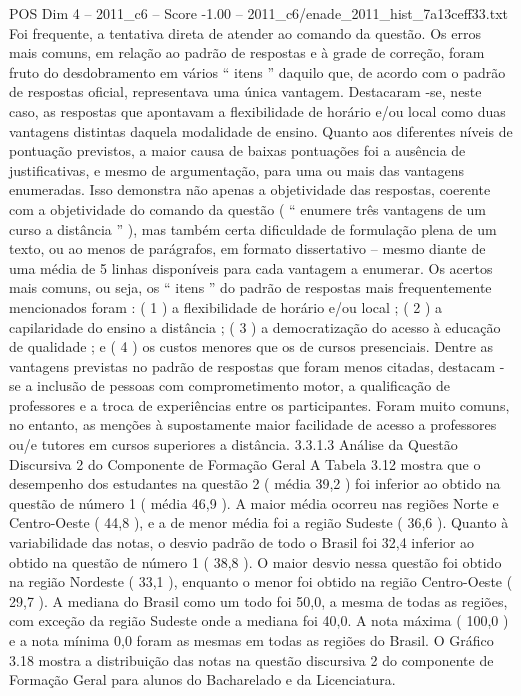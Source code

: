 \begin{textsample}{POS Dim 4 – 2011\_c6 – Score -1.00 – 2011\_c6/enade\_2011\_hist\_7a13ceff33.txt}
Foi frequente, a tentativa direta de atender ao comando da questão.
Os erros mais comuns, em relação ao padrão de respostas e à grade de correção, foram fruto do desdobramento em vários “ itens ” daquilo que, de acordo com o padrão de respostas oficial, representava uma única vantagem.
Destacaram -se, neste caso, as respostas que apontavam a flexibilidade de horário e/ou local como duas vantagens distintas daquela modalidade de ensino.
Quanto aos diferentes níveis de pontuação previstos, a maior causa de baixas pontuações foi a ausência de justificativas, e mesmo de argumentação, para uma ou mais das vantagens enumeradas.
Isso demonstra não apenas a objetividade das respostas, coerente com a objetividade do comando da questão ( “ enumere três vantagens de um curso a distância ” ), mas também certa dificuldade de formulação plena de um texto, ou ao menos de parágrafos, em formato dissertativo – mesmo diante de uma média de 5 linhas disponíveis para cada vantagem a enumerar.
Os acertos mais comuns, ou seja, os “ itens ” do padrão de respostas mais frequentemente mencionados foram : ( 1 ) a flexibilidade de horário e/ou local ; ( 2 ) a capilaridade do ensino a distância ; ( 3 ) a democratização do acesso à educação de qualidade ; e ( 4 ) os custos menores que os de cursos presenciais.
Dentre as vantagens previstas no padrão de respostas que foram menos citadas, destacam -se a inclusão de pessoas com comprometimento motor, a qualificação de professores e a troca de experiências entre os participantes.
Foram muito comuns, no entanto, as menções à supostamente maior facilidade de acesso a professores ou/e tutores em cursos superiores a distância. 3.3.1.3 Análise da Questão Discursiva 2 do Componente de Formação Geral A Tabela 3.12 mostra que o desempenho dos estudantes na questão 2 ( média 39,2 ) foi inferior ao obtido na questão de número 1 ( média 46,9 ).
A maior média ocorreu nas regiões Norte e Centro-Oeste ( 44,8 ), e a de menor média foi a região Sudeste ( 36,6 ).
Quanto à variabilidade das notas, o desvio padrão de todo o Brasil foi 32,4 inferior ao obtido na questão de número 1 ( 38,8 ).
O maior desvio nessa questão foi obtido na região Nordeste ( 33,1 ), enquanto o menor foi obtido na região Centro-Oeste ( 29,7 ).
A mediana do Brasil como um todo foi 50,0, a mesma de todas as regiões, com exceção da região Sudeste onde a mediana foi 40,0.
A nota máxima ( 100,0 ) e a nota mínima 0,0 foram as mesmas em todas as regiões do Brasil.
O Gráfico 3.18 mostra a distribuição das notas na questão discursiva 2 do componente de Formação Geral para alunos do Bacharelado e da Licenciatura.

\end{textsample}
